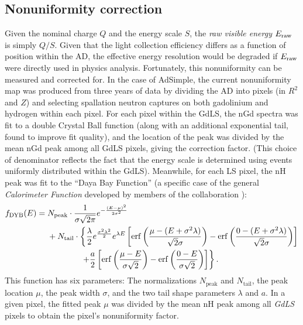 \documentclass[../thesis.tex]{subfiles}
\begin{document}
\subsection{Nonuniformity correction}
\label{sec:reconEnergyNU}

Given the nominal charge $Q$ and the energy scale $S$, the \emph{raw visible energy} $E_\mathrm{raw}$ is simply $Q/S$. Given that the light collection efficiency differs as a function of position within the AD, the effective energy resolution would be degraded if $E_\mathrm{raw}$ were directly used in physics analysis. Fortunately, this nonuniformity can be measured and corrected for. In the case of AdSimple, the current nonuniformity map was produced from three years of data by dividing the AD into pixels (in $R^2$ and $Z$) and selecting spallation neutron captures on both gadolinium and hydrogen within each pixel. For each pixel within the GdLS, the nGd spectra was fit to a double Crystal Ball function (along with an additional exponential tail, found to improve fit quality), and the location of the peak was divided by the mean nGd peak among all GdLS pixels, giving the correction factor. (This choice of denominator reflects the fact that the energy scale is determined using events uniformly distributed within the GdLS). Meanwhile, for each LS pixel, the nH peak was fit to the ``Daya Bay Function'' (a specific case of the general \emph{Calorimeter Function} developed by members of the collaboration \cite{dybfunction}):
\begin{equation}
  \label{eq:dybfunction}
  \begin{aligned}
    f_{\mathrm{DYB}}(E) = \; & N_\mathrm{peak} \cdot \frac{1}{\sigma \sqrt{2\pi}} e^{-\frac{(E-\mu)^2}{2\sigma^2}} \\
    & + N_{\mathrm{tail}} \cdot \left\{ \frac{\lambda}{2} e^{\frac{\sigma^2\lambda^2}{2}}
    e^{\lambda E} \left[ \erf\left( \frac{\mu-(E+\sigma^2\lambda)}{\sqrt{2}\sigma} \right) - \erf \left( \frac{0 - (E+\sigma^2\lambda)}{\sqrt{2}\sigma} \right) \right] \right.\\
    & \phantom{ + N_{\mathrm{tail}} \cdot } \left. \quad+\frac{a}{2} \left[ \erf\left( \frac{\mu-E}{\sigma\sqrt{2}} \right)  - \erf \left( \frac{0-E}{\sigma\sqrt{2}} \right)\right]\right \}.
  \end{aligned}
\end{equation}
This function has six parameters: The normalizations $N_{\mathrm{peak}}$ and $N_{\mathrm{tail}}$, the peak location $\mu$, the peak width $\sigma$, and the two tail shape parameters $\lambda$ and $a$. In a given pixel, the fitted peak $\mu$ was divided by the mean nH peak among all \emph{GdLS} pixels \cite[p. 20]{yuryNonUni} to obtain the pixel's nonuniformity factor.
\end{document}
